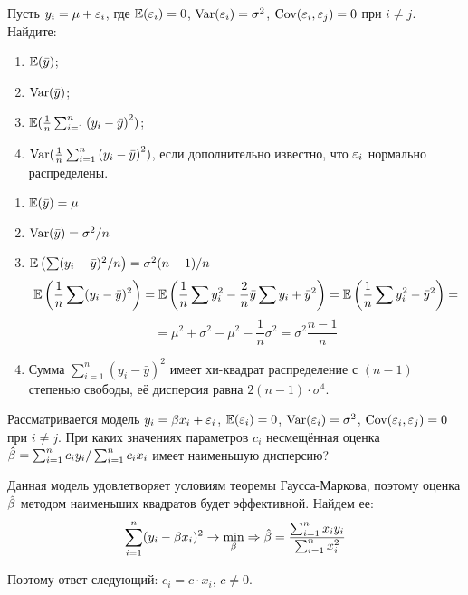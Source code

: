 \begin{problem}
Пусть $y_i=\mu+\varepsilon_i$, где $\mathbb{E}(\varepsilon_i)=0$, $\operatorname{Var}(\varepsilon_i)=\sigma^2$, $\operatorname{Cov}(\varepsilon_i,\varepsilon_j)=0$ при $i \ne j$. Найдите:
\begin{enumerate}
\item $\mathbb{E}(\bar{y})$;
\item $\operatorname{Var}(\bar{y})$;
\item $\mathbb{E}(\frac{1}{n}\sum_{i=1}^n {(y_i-\bar{y})}^2)$;
\item $\operatorname{Var}(\frac{1}{n}\sum_{i=1}^n {(y_i-\bar{y})}^2)$, если дополнительно известно, что $\varepsilon_i$ нормально распределены.
\end{enumerate}


\begin{sol}
\begin{enumerate}
\item \(\mathbb{E}(\bar{y}) = \mu \)
\item \(\operatorname{Var}(\bar{y}) = \sigma^2/n \)
\item \(\mathbb{E} \left(\sum (y_i - \bar{y})^2 /n \right) = \sigma^2 (n-1)/n\)
\[\mathbb{E} \left(\frac{1}{n} \sum (y_i - \bar{y})^2  \right) = \mathbb{E} \left(\frac{1}{n} \sum y_i^2 - \frac{2}{n} \bar{y} \sum y_i + \bar{y}^2 \right) = \mathbb{E} \left(\frac{1}{n} \sum y_i^2 - \bar{y}^2\right) =   \]
\[= \mu^2 + \sigma^2 - \mu^2 - \frac{1}{n}\sigma^2 = \sigma^2 \frac{n-1}{n} \]
\item Сумма $\sum_{i=1}^n {(y_i-\bar{y})}^2$ имеет хи-квадрат распределение с $(n-1)$ степенью свободы, её дисперсия равна $2(n-1)\cdot \sigma^4$.
\end{enumerate}
\end{sol}
\end{problem}



\begin{problem} %
Рассматривается модель $y_i=\beta x_i+\varepsilon_i$, $\mathbb{E}(\varepsilon_i)=0$, $\operatorname{Var}(\varepsilon_i)=\sigma^2$, $\operatorname{Cov}(\varepsilon_i,\varepsilon_j)=0$ при $i \ne j$.
При каких значениях параметров $c_i$ несмещённая оценка $\hat{\beta}=\sum_{i=1}^n {c_i y_i} / \sum_{i=1}^n {c_i x_i}$ имеет наименьшую дисперсию?


\begin{sol}
Данная модель удовлетворяет условиям теоремы Гаусса-Маркова, поэтому оценка $\hat{\beta}$ методом наименьших квадратов будет эффективной. Найдем ее:
\[
\sum\limits_{i=1}^n(y_i-\beta x_i)^2 \rightarrow \min\limits_{\beta} \Rightarrow \hat{\beta} = \frac{\sum_{i=1}^nx_iy_i}{\sum_{i=1}^nx_i^2}
\]

Поэтому ответ следующий: $c_i = c\cdot x_i$, $c \ne 0$.
\end{sol}
\end{problem}



